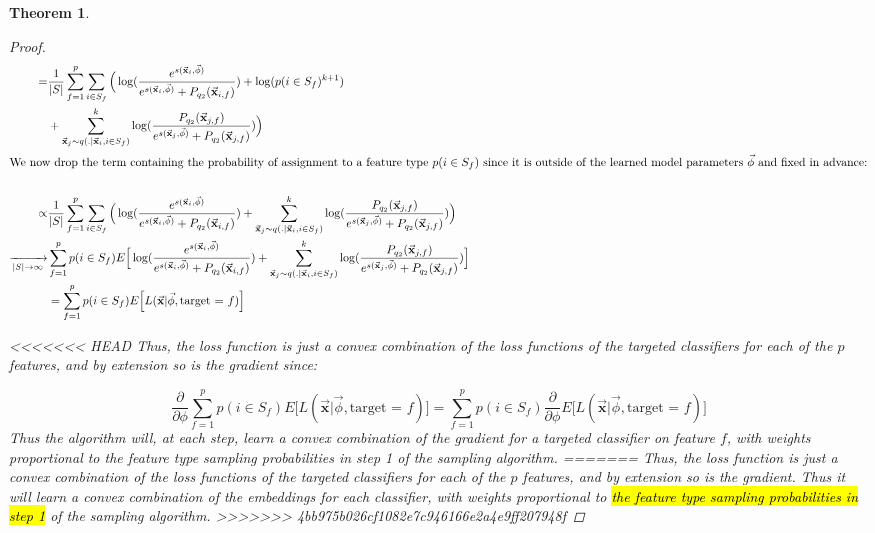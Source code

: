 \documentclass{article} %
\newtheorem{theorem}{Theorem}
\begin{document}
\begin{theorem}
\begin{proof}
\begin{align*}
   = & \frac{1}{|S|}\sum_{f=1}^p \sum_{i \in S_f} \Big( \log(\frac{e^{s(\vec{\mathbf{x}}_i,\vec{\phi}) }}{e^{s(\vec{\mathbf{x}}_i,\vec{\phi}) } + P_{q_2}(\vec{\mathbf{x}}_{i,f}) }) + \log(p(i \in S_f)^{k+1})\\
  &   +  \sum_{\vec{\mathbf{x}}_{j} \sim q(.|\vec{\mathbf{x}}_i,i\in S_f)}^k \log(\frac{ P_{q_2}(\vec{\mathbf{x}}_{j,f})}{e^{s(\vec{\mathbf{x}}_{j},\vec{\phi}) } + P_{q_2}(\vec{\mathbf{x}}_{j,f})})   \Big) \\
\intertext{We now drop the term containing the probability of assignment to a feature type $p(i \in S_f)$ since it is outside of the learned model parameters $\vec{\phi}$ and fixed in advance:}\\
    \propto & \frac{1}{|S|} \sum_{f=1}^p \sum_{i \in S_f} \Big( \log(\frac{e^{s(\vec{\mathbf{x}}_i,\vec{\phi}) }}{e^{s(\vec{\mathbf{x}}_i,\vec{\phi}) } + P_{q_2}(\vec{\mathbf{x}}_{i,f}) }) + \sum_{\vec{\mathbf{x}}_{j} \sim q(.|\vec{\mathbf{x}}_i,i\in S_f)}^k \log(\frac{ P_{q_2}(\vec{\mathbf{x}}_{j,f})}{e^{s(\vec{\mathbf{x}}_{j},\vec{\phi}) } + P_{q_2}(\vec{\mathbf{x}}_{j,f})}) \Big) \\
    \xrightarrow[|S|\rightarrow \infty]{ }  & \sum_{f=1}^p p(i \in S_f) E\Big[ \log(\frac{e^{s(\vec{\mathbf{x}}_i,\vec{\phi}) }}{e^{s(\vec{\mathbf{x}}_i,\vec{\phi}) } + P_{q_2}(\vec{\mathbf{x}}_{i,f}) }) + \sum_{\vec{\mathbf{x}}_{j} \sim q(.|\vec{\mathbf{x}}_i,i\in S_f)}^k \log(\frac{ P_{q_2}(\vec{\mathbf{x}}_{j,f})}{e^{s(\vec{\mathbf{x}}_{j},\vec{\phi}) } + P_{q_2}(\vec{\mathbf{x}}_{j,f})}) \Big] \\
   & = \sum_{f=1}^p p(i \in S_f) E\Big[ L(\vec{\mathbf{x}} |\vec{\phi}, \text{target = $f$}) \Big]
\end{align*}

<<<<<<< HEAD
Thus, the loss function is just a convex combination  of the loss functions of the targeted classifiers for each of the $p$ features, and by extension so is the gradient since:

\[\frac{\partial }{\partial \phi}\sum_{f=1}^p p(i \in S_f) E\Big[ L(\vec{\mathbf{x}} |\vec{\phi}, \text{target = $f$}) \Big] =
 \sum_{f=1}^p p(i \in S_f) \frac{\partial }{\partial \phi}E\Big[ L(\vec{\mathbf{x}} |\vec{\phi}, \text{target = $f$}) \Big]\]
 Thus the algorithm will, at each step, learn a convex combination of the gradient for a targeted classifier on feature $f$, with weights proportional to the feature type sampling probabilities in step 1 of the sampling algorithm.
=======
Thus, the loss function is just a convex combination  of the loss functions of the targeted classifiers for each of the $p$ features, and by extension so is the gradient. Thus it will learn a convex combination of the embeddings for each classifier, with weights proportional to \hl{the feature type sampling probabilities in step 1} of the sampling algorithm.
>>>>>>> 4bb975b026cf1082e7c946166e2a4e9ff207948f

\end{proof}
\end{theorem}
\end{document}
